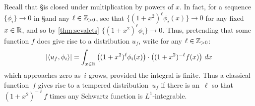   Recall that \S is closed under multiplication by powers of $x$.
  In fact, for a sequence $\{\phi_i\}\rightarrow 0$ in \S and any $\ell\in\mathbb{Z}_{>0}$, see that $\{(1+x^2)^\ell\phi_i(x)\}\rightarrow 0$ for any fixed $x\in\mathbb{R}$, and so by \cref{thm:sevalcts} $\{(1+x^2)^\ell\phi_i\}\rightarrow 0$.
  Thus, pretending that some function $f$ does give rise to a distribution $u_f$, write for any $\ell\in\mathbb{Z}_{>0}$:
  \begin{align*}
    |\langle u_f,\phi_i\rangle| 
    = \int_{x\in\mathbb{R}} \left( (1+x^2)^\ell\phi_i(x) \right) \cdot \left( (1+x^2)^{-\ell} f(x) \right) \,dx
  \end{align*}
  which approaches zero as~$i$ grows, provided the integral is finite.
  Thus a classical function~$f$ gives rise to a tempered distribution~$u_f$ if there is an~$\ell$ so that $(1+x^2)^{-\ell}f$ times any Schwartz function is $L^1$-integrable.

